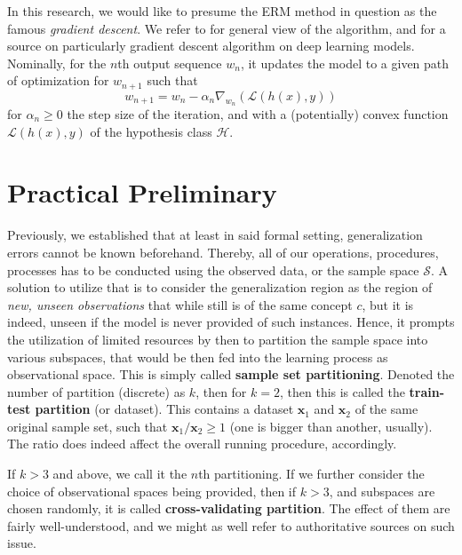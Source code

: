\documentclass[twoside,10pt]{article}
\begin{document}
In this research, we would like to presume the ERM method in question as the famous \textit{gradient descent}. We refer to \cite{achlioptas_stochastic_nodate,ruder_overview_2017} for general view of the algorithm, and \cite{zhang_gradient_2019} for a source on particularly gradient descent algorithm on deep learning models. Nominally, for the $n$th output sequence $w_{n}$, it updates the model to a given path of optimization for $w_{n+1}$ such that 
\begin{equation}
    w_{n+1} = w_{n} - \alpha_{n}\nabla_{w_{n}}(\mathcal{L}(h(x),y))
\end{equation}
for $\alpha_{n}\geq 0$ the step size of the iteration, and with a (potentially) convex function $\mathcal{L}(h(x),y)$ of the hypothesis class $\mathcal{H}$. 

\section{Practical Preliminary}

Previously, we established that at least in said formal setting, generalization errors cannot be known beforehand. Thereby, all of our operations, procedures, processes has to be conducted using the observed data, or the sample space $\mathcal{S}$. A solution to utilize that is to consider the generalization region as the region of \textit{new, unseen observations} that while still is of the same concept $c$, but it is indeed, unseen if the model is never provided of such instances. Hence, it prompts the utilization of limited resources by then to partition the sample space into various subspaces, that would be then fed into the learning process as observational space. This is simply called \textbf{sample set partitioning}. Denoted the number of partition (discrete) as $k$, then for $k=2$, then this is called the \textbf{train-test partition} (or dataset). This contains a dataset $\mathbf{x}_{1}$ and $\mathbf{x}_{2}$ of the same original sample set, such that $\mathbf{x}_{1}/\mathbf{x}_{2}\geq 1$ (one is bigger than another, usually). The ratio does indeed affect the overall running procedure, accordingly.

If $k>3$ and above, we call it the $n$th partitioning. If we further consider the choice of observational spaces being provided, then if $k>3$, and subspaces are chosen randomly, it is called \textbf{cross-validating partition}. The effect of them are fairly well-understood, and we might as well refer to authoritative sources on such issue. 
\end{document}
